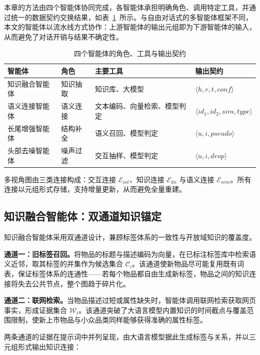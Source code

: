 本章的方法由四个智能体协同完成，各智能体承担明确角色、调用特定工具，并通过统一的数据契约交换结果，如表~\ref{tab:agents}~所示。与自由对话式的多智能体框架不同，本文的智能体以流水线方式协作：上游智能体的输出元组即为下游智能体的输入，从而避免了对话开销与结果不确定性。

\begin{table}[htbp]
  \centering
  \small
  \setlength{\tabcolsep}{5pt}
  \caption{四个智能体的角色、工具与输出契约}
  \label{tab:agents}
  \begin{tabular}{llll}
    \toprule
    智能体 & 角色 & 主要工具 & 输出契约 \\
    \midrule
    知识融合智能体 & 知识抽取 & 知识库、大模型 & $\langle h, r, t, conf\rangle$ \\
    语义连接智能体 & 语义连接 & 文本编码、向量检索、模型判定 & $\langle id_1, id_2, sim, type\rangle$ \\
    长尾增强智能体 & 结构补全 & 语义召回、模型判定 & $\langle u, i, pseudo\rangle$ \\
    头部去噪智能体 & 噪声过滤 & 交互抽样、模型判定 & $\langle u, i, drop\rangle$ \\
    \bottomrule
  \end{tabular}
\end{table}

多视角图由三类连接构成：交互连接 $\mathcal{E}_{int}$、知识连接 $\mathcal{E}_{kn}$ 与语义连接 $\mathcal{E}_{sem}$。所有连接以元组形式存储，支持增量更新，从而避免全量重建。

\subsection{知识融合智能体：双通道知识锚定}
\label{subsec:knowledge-agent}

知识融合智能体采用双通道设计，兼顾标签体系的一致性与开放域知识的覆盖度。

\textbf{通道一：旧标签召回。}将物品的标题与描述编码为向量，在已标注标签库中检索语义近邻，取其标签的并集作为候选集合 $\mathcal{C}_i$。该通道使新物品尽可能复用既有词表，保证标签体系的连通性——若每个物品都自由生成新标签，物品之间的知识连接将失去公共节点，整个图趋于碎片化。

\textbf{通道二：联网检索。}当物品描述过短或属性缺失时，智能体调用联网检索获取网页事实，形成证据集合 $\mathcal{W}_i$。该通道突破了大语言模型内置知识的时间截点与覆盖范围限制，使新上市物品与小众品类同样能够获得准确的属性标签。

两条通道的证据在提示词中并列呈现，由大语言模型据此生成标签与关系，并以三元组形式输出知识连接：

